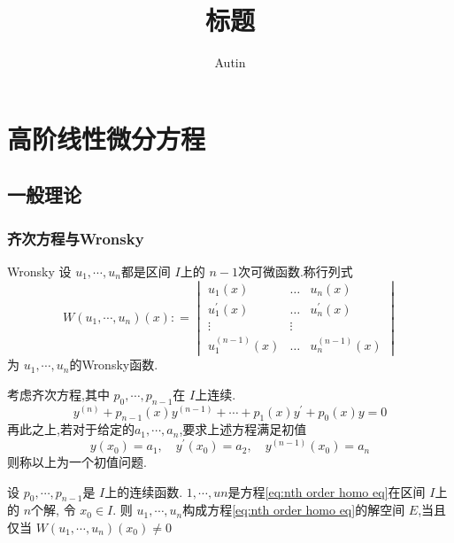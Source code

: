 \documentclass[lang=cn,12pt,color=green,fontset=none]{elegantbook}
\title{标题}
\author{Autin}
\begin{document}
\maketitle
\frontmatter

\tableofcontents

\mainmatter

\chapter{高阶线性微分方程}

\section{一般理论}

\subsection{齐次方程与Wronsky}

\begin{definition}{Wronsky}
    设 \(   u_1,\cdots,u_n   \)都是区间 \(  I  \)上的  \(  n-1  \)次可微函数.称行列式 \[
    W\left(  u_1,\cdots,u_n  \right)\left( x \right): = \begin{vmatrix}u_1(x)&\ldots&u_n(x)\\u_1^{\prime}(x)&\ldots&u_n^{\prime}(x)\\\vdots&\vdots\\u_1^{(n-1)}(x)&\ldots &u_n^{(n-1)}(x)\end{vmatrix}  
    \]为 \(   u_1,\cdots,u_n   \)的Wronsky函数. 
\end{definition}


考虑齐次方程,其中 \(   p_0,\cdots,p_{n-1}   \)在 \(  I  \)上连续.  
\begin{equation}\label{eq:nth order homo eq}
    y^{\left( n \right) }+ p_{n-1}\left( x \right)y^{\left( n-1 \right) }+ \cdots + p_1\left( x \right)y^{\prime} + p_0\left( x \right)y=0
\end{equation}   
再此之上,若对于给定的\(   a_1,\cdots,a_n   \),要求上述方程满足初值
\begin{equation}\label{initial condition}
y\left( x_0 \right)=a_1,\quad y^{\prime} \left( x_0 \right)=a_2,\quad y^{\left( n-1 \right) }\left( x_0 \right)   =a_{n}
\end{equation}
则称以上为一个初值问题.


\begin{proposition}
    设 \(   p_0,\cdots,p_{n-1}   \)是 \(  I  \)上的连续函数. \(   1,\cdots,u n  \)是方程\ref{eq:nth order homo eq}在区间 \(  I  \)上 的 \(  n  \)个解,  令 \(  x_0\in I  \).
    则 \(   u_1,\cdots,u_n   \)构成方程\ref{eq:nth order homo eq}的解空间 \(  E  \),当且仅当 \(  W\left(  u_1,\cdots,u_n  \right)\left( x_0 \right)\neq 0    \)    
\end{proposition}
\end{document}
